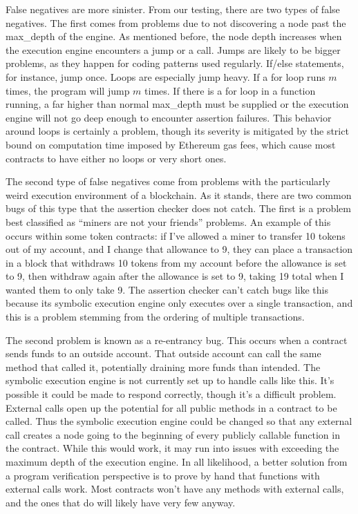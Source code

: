 \documentclass[acmsmall]{acmart}\settopmatter{}
\begin{document}
False negatives are more sinister. From our testing, there are two types of false negatives. The first comes from problems due to not discovering a node past the max\_depth of the engine. As mentioned before, the node depth increases when the execution engine encounters a jump or a call. Jumps are likely to be bigger problems, as they happen for coding patterns used regularly. If/else statements, for instance, jump once. Loops are especially jump heavy. If a for loop runs $m$ times, the program will jump $m$ times. If there is a for loop in a function running, a far higher than normal max\_depth must be supplied or the execution engine will not go deep enough to encounter assertion failures. This behavior around loops is certainly a problem, though its severity is mitigated by the strict bound on computation time imposed by Ethereum gas fees, which cause most contracts to have either no loops or very short ones.

The second type of false negatives come from problems with the particularly weird execution environment of a blockchain. As it stands, there are two common bugs of this type that the assertion checker does not catch. The first is a problem best classified as ``miners are not your friends'' problems. An example of this occurs within some token contracts: if I've allowed a miner to transfer 10 tokens out of my account, and I change that allowance to 9, they can place a transaction in a block that withdraws 10 tokens from my account before the allowance is set to 9, then withdraw again after the allowance is set to 9, taking 19 total when I wanted them to only take 9. The assertion checker can't catch bugs like this because its symbolic execution engine only executes over a single transaction, and this is a problem stemming from the ordering of multiple transactions.

The second problem is known as a re-entrancy bug. This occurs when a contract sends funds to an outside account. That outside account can call the same method that called it, potentially draining more funds than intended. The symbolic execution engine is not currently set up to handle calls like this. It's possible it could be made to respond correctly, though it's a difficult problem. External calls open up the potential for all public methods in a contract to be called. Thus the symbolic execution engine could be changed so that any external call creates a node going to the beginning of every publicly callable function in the contract. While this would work, it may run into issues with exceeding the maximum depth of the execution engine. In all likelihood, a better solution from a program verification perspective is to prove by hand that functions with external calls work. Most contracts won't have any methods with external calls, and the ones that do will likely have very few anyway.
\end{document}
